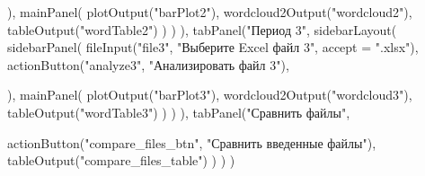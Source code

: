                          ),
                         mainPanel(
                           plotOutput("barPlot2"),
                           wordcloud2Output("wordcloud2"),
                           tableOutput("wordTable2")
                         )
                       )
              ),
              tabPanel("Период 3",
                       sidebarLayout(
                         sidebarPanel(
                           fileInput("file3", "Выберите Excel файл 3", accept = ".xlsx"),
                           actionButton("analyze3", "Анализировать файл 3"),
                           
                         ),
                         mainPanel(
                           plotOutput("barPlot3"),
                           wordcloud2Output("wordcloud3"),
                           tableOutput("wordTable3")
                         )
                       )
              ),
              tabPanel("Сравнить файлы",
                       
                       actionButton("compare_files_btn", "Сравнить введенные файлы"),
                       tableOutput("compare_files_table")
              )
  )
)

